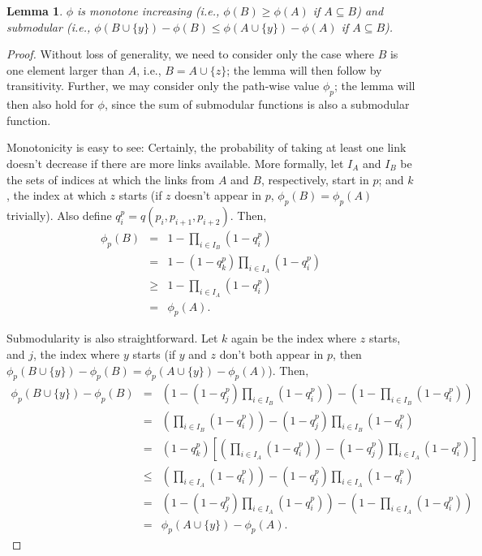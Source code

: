 \documentclass[11pt,letterpaper]{article}
\newtheorem{lemma}{Lemma}
\begin{document}
\begin{lemma}
\label{thm:monotonicity}
$\phi$ is monotone increasing (i.e., $\phi(B) \geq \phi(A)$ if $A \subseteq B$) and submodular (i.e., $\phi(B \cup \{y\}) - \phi(B) \leq \phi(A \cup \{y\}) - \phi(A)$ if $A \subseteq B$).
\end{lemma}

\begin{proof}[Proof]
Without loss of generality, we need to consider only the case where $B$ is one element larger than $A$, i.e., $B = A \cup \{z\}$; the lemma will then follow by transitivity. Further, we may consider only the path-wise value $\phi_p$; the lemma will then also hold for $\phi$, since the sum of submodular functions is also a submodular function.

Monotonicity is easy to see: Certainly, the probability of taking at least one link doesn't decrease if there are more links available. More formally, let $I_A$ and $I_B$ be the sets of indices at which the links from $A$ and $B$, respectively, start in $p$; and $k$, the index at which $z$ starts (if $z$ doesn't appear in $p$, $\phi_p(B)=\phi_p(A)$ trivially).
Also define $q^p_i = q(p_i,p_{i+1},p_{i+2})$.
Then,
\begin{eqnarray}
\phi_p(B)  &=& 1 - \prod_{i \in I_B} \left( 1 - q^p_i \right) \\
                      &=& 1 - (1 - q^p_k) \prod_{i \in I_A} \left( 1 - q^p_i \right) \\
                      &\geq& 1 - \prod_{i \in I_A} \left( 1 - q^p_i \right) \\
                      &=& \phi_p(A).
\end{eqnarray}

Submodularity is also straightforward. Let $k$ again be the index where $z$ starts, and $j$, the index where $y$ starts (if $y$ and $z$ don't both appear in $p$, then $\phi_p(B \cup \{y\}) - \phi_p(B) = \phi_p(A \cup \{y\}) - \phi_p(A)$). Then,
\begin{eqnarray}
\phi_p(B \cup \{y\}) - \phi_p(B) 
  &=& \left(1 - (1 - q^p_j) \prod_{i \in I_B} \left( 1 - q^p_i \right)\right)
    - \left(1 - \prod_{i \in I_B} \left( 1 - q^p_i \right)\right) \\
  &=& \left(\prod_{i \in I_B} \left( 1 - q^p_i \right)\right) - (1 - q^p_j) \prod_{i \in I_B} \left( 1 - q^p_i \right) \\
  &=& (1 - q^p_k) \left[\left(\prod_{i \in I_A} \left( 1 - q^p_i \right)\right) - (1 - q^p_j) \prod_{i \in I_A} \left( 1 - q^p_i \right)\right] \\
  &\leq& \left(\prod_{i \in I_A} \left( 1 - q^p_i \right)\right) - (1 - q^p_j) \prod_{i \in I_A} \left( 1 - q^p_i \right) \\
  &=& \left(1 - (1 - q^p_j) \prod_{i \in I_A} \left( 1 - q^p_i \right)\right)
    - \left(1 - \prod_{i \in I_A} \left( 1 - q^p_i \right)\right) \\
  &=& \phi_p(A \cup \{y\}) - \phi_p(A).
\end{eqnarray}
\end{proof}
\end{document}
